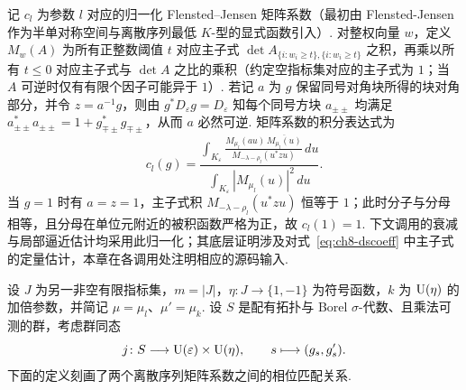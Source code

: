 记 $c_l$ 为参数 $l$ 对应的归一化 Flensted--Jensen 矩阵系数（最初由 Flensted-Jensen~\cite{FlenstedJensen1980} 作为半单对称空间与离散序列最低 $K$-型的显式函数引入）. 对整权向量 $w$，定义 $M_w(A)$ 为所有正整数阈值 $t$ 对应主子式 $\det A_{\{i:w_i\ge t\},\{i:w_i\ge t\}}$ 之积，再乘以所有 $t\le0$ 对应主子式与 $\det A$ 之比的乘积（约定空指标集对应的主子式为 $1$；当 $A$ 可逆时仅有有限个因子可能异于 $1$）. 若记 $a$ 为 $g$ 保留同号对角块所得的块对角部分，并令 $z=a^{-1}g$，则由 $g^*D_\varepsilon g=D_\varepsilon$ 知每个同号方块 $a_{\pm\pm}$ 均满足 $a_{\pm\pm}^*a_{\pm\pm}=1+g_{\mp\pm}^*g_{\mp\pm}$，从而 $a$ 必然可逆. 矩阵系数的积分表达式为
\begin{equation}
\label{eq:ch8-dscoeff}
c_l(g)=
\frac{
 \displaystyle\int_{K_\varepsilon}
 \frac{M_{\mu_l}(au)\,\overline{M_{\mu_l}(u)}}
 {M_{-\lambda-\rho_l}(u^*zu)}\,du
}{
 \displaystyle\int_{K_\varepsilon}|M_{\mu_l}(u)|^2\,du
}.
\end{equation}
当 $g=1$ 时有 $a=z=1$，主子式积 $M_{-\lambda-\rho_l}(u^*zu)$ 恒等于 $1$；此时分子与分母相等，且分母在单位元附近的被积函数严格为正，故 $c_l(1)=1$. 下文调用的衰减与局部逼近估计均采用此归一化；其底层证明涉及对式~\eqref{eq:ch8-dscoeff} 中主子式的定量估计，本章在各调用处注明相应的源码输入.

设 $J$ 为另一非空有限指标集，$m=|J|$，$\eta\colon J\to\{1,-1\}$ 为符号函数，$k$ 为 $\operatorname{U}(\eta)$ 的加倍参数，并简记 $\mu=\mu_l$、$\mu'=\mu_k$. 设 $S$ 是配有拓扑与 Borel $\sigma$-代数、且乘法可测的群，考虑群同态
\[
j\colon S\longrightarrow \operatorname{U}(\varepsilon)\times \operatorname{U}(\eta),\qquad
s\longmapsto (g_s,g'_s).
\]
下面的定义刻画了两个离散序列矩阵系数之间的相位匹配关系.

